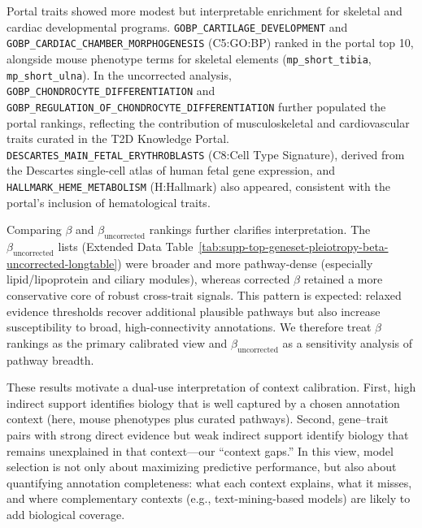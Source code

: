 Portal traits showed more modest but interpretable enrichment for skeletal and cardiac developmental programs. \texttt{GOBP\_CARTILAGE\_DEVELOPMENT} and \texttt{GOBP\_CARDIAC\_CHAMBER\_MORPHOGENESIS} (C5:GO:BP) ranked in the portal top 10, alongside mouse phenotype terms for skeletal elements (\texttt{mp\_short\_tibia}, \texttt{mp\_short\_ulna}). In the uncorrected analysis, \texttt{GOBP\_CHONDROCYTE\_DIFFERENTIATION} and \texttt{GOBP\_REGULATION\_OF\_CHONDROCYTE\_DIFFERENTIATION} further populated the portal rankings, reflecting the contribution of musculoskeletal and cardiovascular traits curated in the T2D Knowledge Portal. \texttt{DESCARTES\_MAIN\_FETAL\_ERYTHROBLASTS} (C8:Cell Type Signature), derived from the Descartes single-cell atlas of human fetal gene expression\cite{cao_descartes_2020}, and \texttt{HALLMARK\_HEME\_METABOLISM} (H:Hallmark) also appeared, consistent with the portal's inclusion of hematological traits.

Comparing $\beta$ and $\beta_\text{uncorrected}$ rankings further clarifies interpretation. The $\beta_\text{uncorrected}$ lists (Extended Data Table~\ref{tab:supp-top-geneset-pleiotropy-beta-uncorrected-longtable}) were broader and more pathway-dense (especially lipid/lipoprotein and ciliary modules), whereas corrected $\beta$ retained a more conservative core of robust cross-trait signals. This pattern is expected: relaxed evidence thresholds recover additional plausible pathways but also increase susceptibility to broad, high-connectivity annotations. We therefore treat $\beta$ rankings as the primary calibrated view and $\beta_\text{uncorrected}$ as a sensitivity analysis of pathway breadth.


These results motivate a dual-use interpretation of context calibration. First, high indirect support identifies biology that is well captured by a chosen annotation context (here, mouse phenotypes plus curated pathways). Second, gene--trait pairs with strong direct evidence but weak indirect support identify biology that remains unexplained in that context---our ``context gaps.'' In this view, model selection is not only about maximizing predictive performance, but also about quantifying annotation completeness: what each context explains, what it misses, and where complementary contexts (e.g., text-mining-based models) are likely to add biological coverage.


